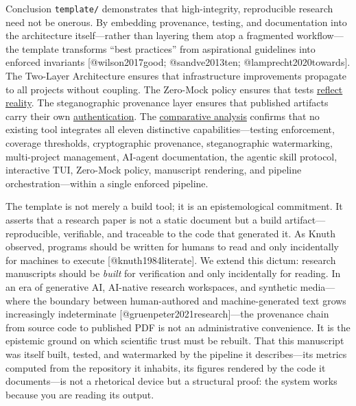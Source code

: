 \documentclass[
  ignorenonframetext,
]{beamer}
\begin{document}
\begin{frame}[fragile]{Conclusion}
\protect{}\label{conclusion}
\texttt{template/} demonstrates that high-integrity, reproducible
research need not be onerous. By embedding provenance, testing, and
documentation into the architecture itself---rather than layering them
atop a fragmented workflow---the template transforms ``best practices''
from aspirational guidelines into enforced invariants
{[}@wilson2017good; @sandve2013ten; @lamprecht2020towards{]}. The
Two-Layer Architecture ensures that infrastructure improvements
propagate to all projects without coupling. The Zero-Mock policy ensures
that tests
\href{05a_zeromock_tradeoff.md\#the-zero-mock-tradeoff}{reflect
reality}. The steganographic provenance layer ensures that published
artifacts carry their own
\href{07_security_provenance.md\#security-and-provenance}{authentication}.
The \href{08f_appendix_matrix.md\#appendix-matrix}{comparative analysis}
confirms that no existing tool integrates all eleven distinctive
capabilities---testing enforcement, coverage thresholds, cryptographic
provenance, steganographic watermarking, multi-project management,
AI-agent documentation, the agentic skill protocol, interactive TUI,
Zero-Mock policy, manuscript rendering, and pipeline
orchestration---within a single enforced pipeline.

The template is not merely a build tool; it is an epistemological
commitment. It asserts that a research paper is not a static document
but a build artifact---reproducible, verifiable, and traceable to the
code that generated it. As Knuth observed, programs should be written
for humans to read and only incidentally for machines to execute
{[}@knuth1984literate{]}. We extend this dictum: research manuscripts
should be \emph{built} for verification and only incidentally for
reading. In an era of generative AI, AI-native research workspaces, and
synthetic media---where the boundary between human-authored and
machine-generated text grows increasingly indeterminate
{[}@gruenpeter2021research{]}---the provenance chain from source code to
published PDF is not an administrative convenience. It is the epistemic
ground on which scientific trust must be rebuilt. That this manuscript
was itself built, tested, and watermarked by the pipeline it
describes---its metrics computed from the repository it inhabits, its
figures rendered by the code it documents---is not a rhetorical device
but a structural proof: the system works because you are reading its
output.
\end{frame}
\end{document}
